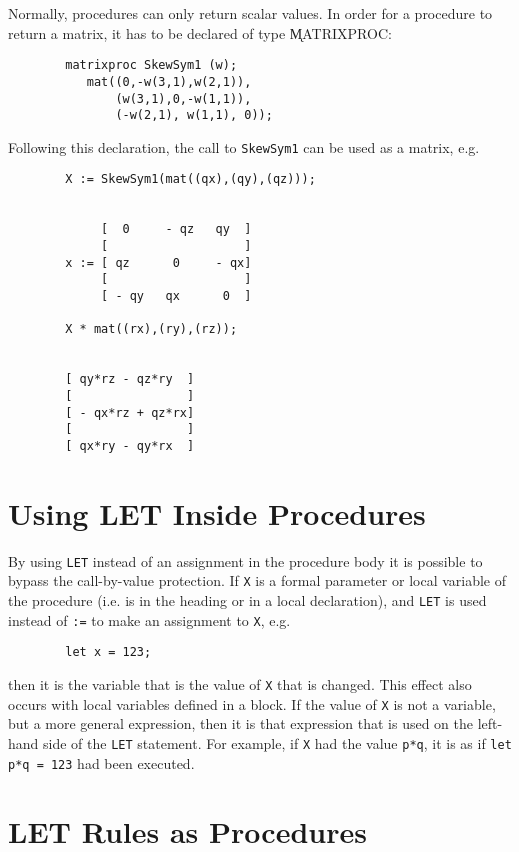 Normally, procedures can only return scalar values. In order for a procedure to
return a matrix, it has to be declared of 
type \k{MATRIXPROC}:
\begin{verbatim}
        matrixproc SkewSym1 (w);
           mat((0,-w(3,1),w(2,1)),
               (w(3,1),0,-w(1,1)),
               (-w(2,1), w(1,1), 0));
\end{verbatim}
Following this declaration, the call to \texttt{SkewSym1} can be used as a matrix, e.g.
\begin{verbatim}
        X := SkewSym1(mat((qx),(qy),(qz)));


             [  0     - qz   qy  ]
             [                   ]
        x := [ qz      0     - qx]
             [                   ]
             [ - qy   qx      0  ]

        X * mat((rx),(ry),(rz));


        [ qy*rz - qz*ry  ]
        [                ]
        [ - qx*rz + qz*rx]
        [                ]
        [ qx*ry - qy*rx  ]
\end{verbatim}


\section{Using LET Inside Procedures}

By using \texttt{LET} instead of an assignment in the procedure
body it is possible to bypass the call-by-value
 protection.  If \texttt{X} is a formal parameter or local
variable of the procedure (i.e. is in the heading or in a local
declaration), and \texttt{LET} is used instead of \texttt{:=} to make an
assignment to \texttt{X}, e.g.

\begin{verbatim}
        let x = 123;
\end{verbatim}
then it is the variable that is the value of \texttt{X} that is changed.
This effect also occurs with local variables defined in a block.  If the
value of \texttt{X} is not a variable, but a more general expression, then it
is that expression that is used on the left-hand side of the \texttt{LET}
statement.  For example, if \texttt{X} had the value \texttt{p*q}, it is as if
\texttt{let p*q = 123} had been executed.

\section{LET Rules as Procedures}

